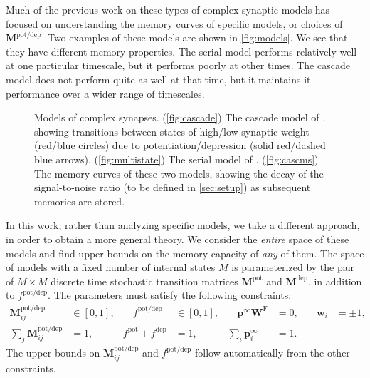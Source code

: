 \documentclass{article} %
\newcommand{\pr}{\mathbf{p}}
\newcommand{\eq}{\pr^\infty}
\newcommand{\w}{\mathbf{w}}
\newcommand{\W}{\mathbf{W}}
\newcommand{\M}{\mathbf{M}}
\newcommand{\frg}{\W^{\mathrm{F}}}
\newcommand{\pot}{^{\text{pot}}}
\newcommand{\dep}{^{\text{dep}}}
\newcommand{\potdep}{^{\text{pot/dep}}}
\begin{document}
Much of the previous work on these types of complex synaptic models has focused on understanding the memory curves of specific models, or choices of $\M\potdep$.
Two examples of these models are shown in \autoref{fig:models}. We see that they have different memory properties.
The serial model performs relatively well at one particular timescale, but it performs poorly at other times.
The cascade model does not perform quite as well at that time, but it maintains it performance over a wider range of timescales.

\begin{figure}[tbp]
 \begin{center}
 \begin{myenuma}
  \item{}\label{fig:cascade}
  \item{}\label{fig:multistate}
  \item{}\label{fig:cascms}
 \end{myenuma}
 \end{center}
  \caption{Models of complex synapses.
  (\ref{fig:cascade}) The cascade model of \cite{Fusi2005cascade}, showing transitions between states of high/low synaptic weight (red/blue circles) due to potentiation/depression (solid red/dashed blue arrows).
  (\ref{fig:multistate}) The serial model of \cite{Leibold2008serial}.
  (\ref{fig:cascms}) The memory curves of these two models, showing the decay of the signal-to-noise ratio (to be defined in \autoref{sec:setup}) as subsequent memories are stored.
  }\label{fig:models}
\end{figure}


In this work, rather than analyzing specific models,  we take a different approach, in order to obtain a more general theory.
We consider the \emph{entire} space of these models and find upper bounds on the memory capacity of \emph{any} of them.
The space of models with a fixed number of internal states $M$ is parameterized by the pair of $M \times M$ discrete time stochastic
transition matrices $\M\pot$ and $\M\dep$, in addition to $f\potdep$.  The parameters must satisfy the following constraints:
%
\begin{equation}\label{eq:constr}
\begin{aligned}
  \M\potdep_{ij} &\in [0,1], &\quad
  f\potdep &\in [0,1], &\quad
  \eq\frg &= 0, &\quad
  \w_i &= \pm 1, \\
  \sum_j \M\potdep_{ij} &= 1, &
  f\pot + f\dep &= 1, &
  \sum_i \eq_i &= 1.
\end{aligned}
\end{equation}
%
The upper bounds on $\M\potdep_{ij}$ and $f\potdep$ follow automatically from the other constraints.
\end{document}
